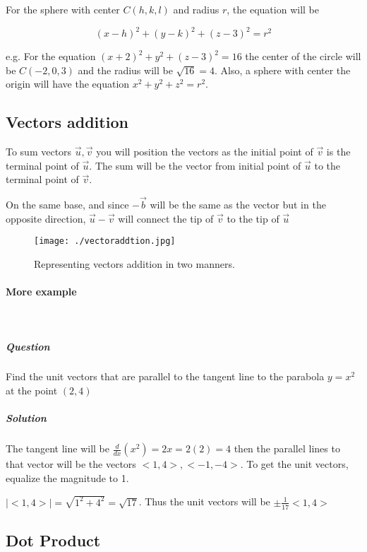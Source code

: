 \documentclass{article}
\begin{document}
	For the sphere with center $C(h,k,l)$ and radius $r$, the equation will be

	\begin{equation}
		(x-h)^2 + (y-k)^2 +(z-3)^2 = r^2
	\end{equation}

	e.g. For the equation $(x+2)^2 + y^2 + (z-3)^2 = 16$ the center of the circle will be $C(-2,0,3)$ and the radius will be $ \sqrt{16} = 4$. Also, a sphere with center the origin will have the equation $x^2+y^2+z^2=r^2$.

	\subsection{Vectors addition}

	To sum vectors $\vec{u}, \vec{v}$ you will position the vectors as the initial point of $\vec{v}$ is the terminal point of $\vec{u}$. The sum will be the vector from initial point of $\vec{u}$ to the terminal point of $\vec{v}$.

	On the same base, and since $-\vec{b}$ will be the same as the vector but in the opposite direction, $\vec{u} - \vec{v}$ will connect the tip of $\vec{v}$ to the tip of $\vec{u}$

	\begin{figure}[h!]
		\texttt{[image: ./vectoraddtion.jpg]}
		\caption{Representing vectors addition in two manners.}
	\end{figure}


	\paragraph{More example} \

	\subparagraph{Question}
	Find the unit vectors that are parallel to the tangent line to the parabola $y=x^2$ at the point $(2,4)$

	\subparagraph{Solution}
	The tangent line will be $ \frac{d}{dx}(x^2) = 2x = 2(2) = 4$ then the parallel lines to that vector will be the vectors $<1,4>,<-1,-4>$. To get the unit vectors, equalize the magnitude to 1. 

	$|<1,4>| = \sqrt{1^2 + 4^2} = \sqrt{17}$. Thus the unit vectors will be $\pm\frac{1}{17}<1,4>$

	\newpage

	\subsection{Dot Product}
\end{document}
